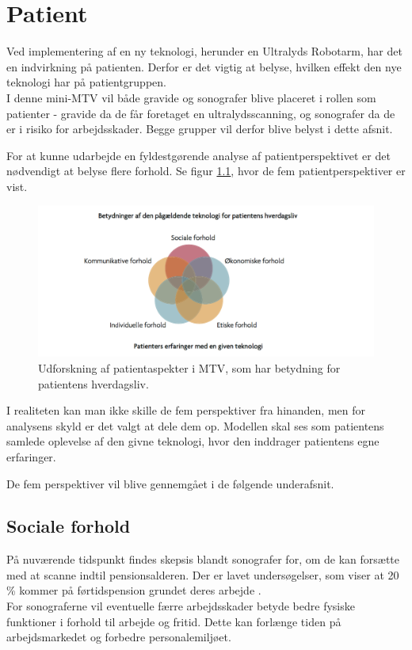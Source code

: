 \chapter{Patient}
Ved implementering af en ny teknologi, herunder en Ultralyds Robotarm, har det en indvirkning på patienten. Derfor er det vigtig at belyse, hvilken effekt den nye teknologi har på patientgruppen. \\
I denne mini-MTV vil både gravide og sonografer blive placeret i rollen som patienter - gravide da de får foretaget en ultralydsscanning, og sonografer da de er i risiko for arbejdsskader. Begge grupper vil derfor blive belyst i dette afsnit.  

For at kunne udarbejde en fyldestgørende analyse af patientperspektivet er det nødvendigt at belyse flere forhold. Se figur \ref{patientMTV}, hvor de fem patientperspektiver er vist. 
\begin{figure}[h!]\centering
	\includegraphics[width = 1.0\textwidth]{Figurer/PatientaspekterMTV}
	\caption{Udforskning af patientaspekter i MTV, som har betydning for patientens hverdagsliv. \cite{Leavitt}}
	\label{patientMTV}
\end{figure}

I realiteten kan man ikke skille de fem perspektiver fra hinanden, men for analysens skyld er det valgt at dele dem op. Modellen skal ses som patientens samlede oplevelse af den givne teknologi, hvor den inddrager patientens egne erfaringer. 

De fem perspektiver vil blive gennemgået i de følgende underafsnit. 

\section{Sociale forhold}
På nuværende tidspunkt findes skepsis blandt sonografer for, om de kan forsætte med at scanne indtil pensionsalderen. Der er lavet undersøgelser, som viser at 20 \% kommer på førtidspension grundet deres arbejde \cite{32}.  \\ 
For sonograferne vil eventuelle færre arbejdsskader betyde bedre fysiske funktioner i forhold til arbejde og fritid. Dette kan forlænge tiden på arbejdsmarkedet og forbedre personalemiljøet.      

